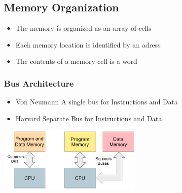 \subsection{Memory Organization }
		\begin{itemize}
			\item The memory is organized as an array of cells
			\item Each memory location is identified by an adress
			\item The contents of a memory cell is a word
		\end{itemize}
\subsubsection{Bus Architecture}
\begin{minipage}{9cm}
    \begin{itemize}
        \item Von Neumann
        \subitem A single bus for Instructions and Data
        \item Harvard
        \subitem Separate Bus for Instructions and Data
    \end{itemize}
\end{minipage}
\begin{minipage}{7cm}
    \includegraphics[width=7cm]{images/bus.png}
\end{minipage}

